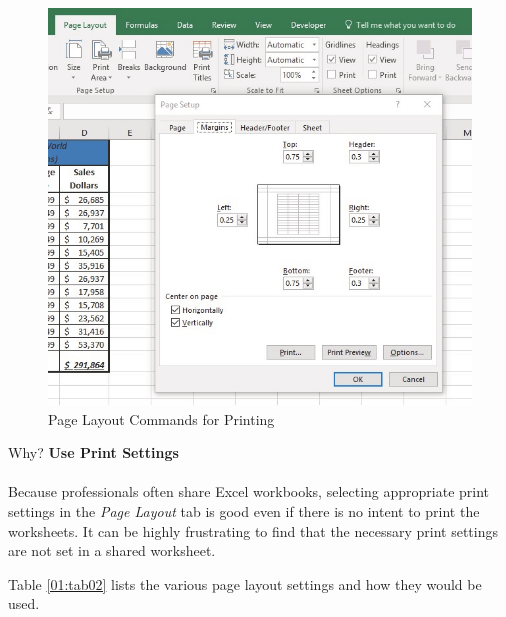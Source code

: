 \begin{figure}[H]
	\centering
	\includegraphics[width=\maxwidth{.95\linewidth}]{gfx/ch01_fig49}
	\caption{Page Layout Commands for Printing}
	\label{01:fig49}
\end{figure}

\begin{center}
	\begin{infobox}{Why?}
		\textbf{Use Print Settings}
		\\
		\\
		Because professionals often share Excel workbooks, selecting appropriate print settings in the \textit{Page Layout} tab is good even if there is no intent to print the worksheets. It can be highly frustrating to find that the necessary print settings are not set in a shared worksheet. 
	\end{infobox}
\end{center}

Table \ref{01:tab02} lists the various page layout settings and how they would be used.

